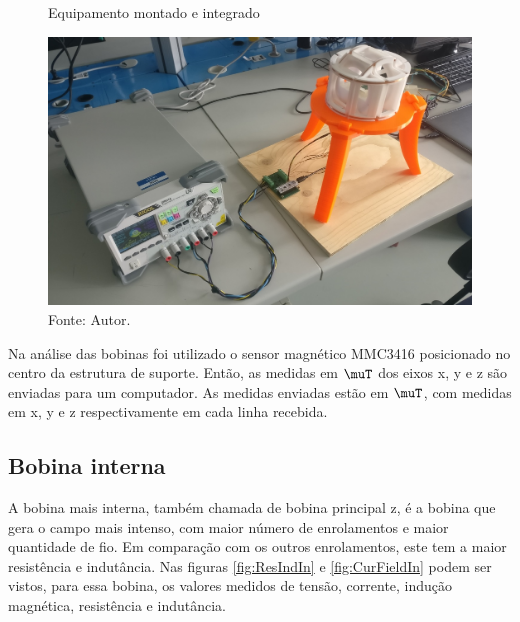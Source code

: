 \begin{figure}[H]
    \centering
     \caption{Equipamento montado e integrado}
     \includegraphics[width=1\textwidth]{./img/resultados/resultSystem.jpg}
     \caption*{Fonte: Autor.}\label{fig:final}
\end{figure}

Na análise das bobinas foi utilizado o sensor magnético MMC3416 posicionado no centro da estrutura de suporte. Então, as medidas em $\muT$ dos eixos x, y e z são enviadas para um computador. As medidas enviadas estão em $\muT$, com medidas em x, y e z respectivamente em cada linha recebida.

\subsection{Bobina interna}

A bobina mais interna, também chamada de bobina principal z, é a bobina que gera o campo mais intenso, com maior número de enrolamentos e maior quantidade de fio. Em comparação com os outros enrolamentos, este tem a maior resistência e indutância. Nas figuras \ref{fig:ResIndIn} e \ref{fig:CurFieldIn} podem ser vistos, para essa bobina, os valores medidos de tensão, corrente, indução magnética, resistência e indutância.

